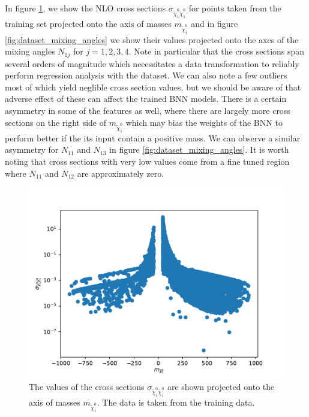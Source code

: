 In figure \ref{fig:dataset_masses}, we show the NLO cross sections $\sigma_{\tilde{\chi}_1^0 \tilde{\chi}_1^0}$ for points taken from the training set projected onto the axis of masses $m_{\tilde{\chi}_1^0}$ and in figure \ref{fig:dataset_mixing_angles} we show their values projected onto the axes of the mixing angles $N_{1j}$ for $j=1,2,3,4$. 
Note in particular that the cross sections span several orders of magnitude which necessitates a data transformation to reliably perform regression analysis with the dataset. We can also note a few outliers most of which yield neglible cross section values, but we should be aware of that adverse effect of these can affect the trained BNN models. There is a certain asymmetry in some of the features as well, where there are largely more cross sections on the right side of $m_{\tilde{\chi}_1^0}$ which may bias the weights of the BNN to perform better if the its input contain a positive mass. We can observe a similar asymmetry for $N_{11}$ and $N_{13}$ in figure \ref{fig:dataset_mixing_angles}. It is worth noting that cross sections with very low values come from a fine tuned region where $N_{11}$ and $N_{12}$ are approximately zero.


\begin{figure}[h!]
    \centering
    \includegraphics[scale=0.7]{figures/dataset/masses.pdf}
    \caption{The values of the cross sections $\sigma_{\tilde{\chi}_1^0 \tilde{\chi}_1^0}$ are shown projected onto the axis of masses $m_{\tilde{\chi}_1^0}$. The data is taken from the training data.
    }\label{fig:dataset_masses}
\end{figure}


